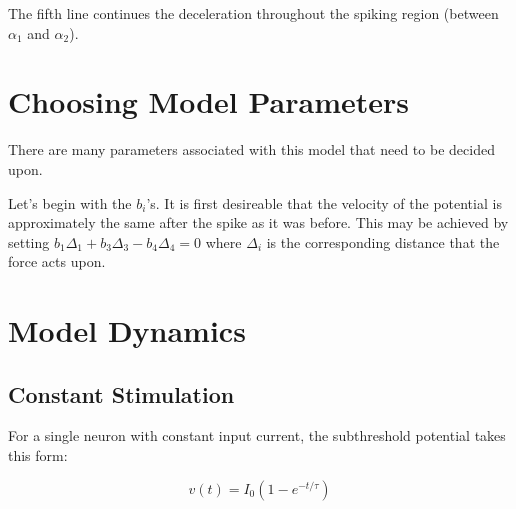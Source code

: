 \documentclass[a4paper]{article}
\begin{document}
The fifth line continues the deceleration throughout the spiking region (between $\alpha_1$ and $\alpha_2$).

\section{Choosing Model Parameters}

There are many parameters associated with this model that need to be decided upon.

Let's begin with the $b_i$'s. It is first desireable that the velocity of the potential is approximately the same after the spike as it was before. This may be achieved by setting $b_1 \Delta_1 + b_3 \Delta_3 - b_4 \Delta_4 = 0$ where $\Delta_i$ is the corresponding distance that the force acts upon.


\section{Model Dynamics}
\subsection{Constant Stimulation}

For a single neuron with constant input current, the subthreshold potential takes this form:

$$
v(t) = I_0 (1 - e^{-t / \tau})
$$
\end{document}
